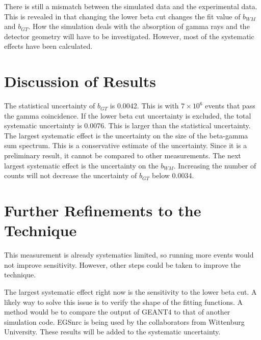 \documentclass[../MaxHughesThesis.tex]{subfiles}
\begin{document}
There is still a mismatch between the simulated data and the experimental data.
This is revealed in that changing the lower beta cut changes the fit value of $b_{WM}$ and $b_{GT}$.
How the simulation deals with the absorption of gamma rays and the detector geometry will have to be investigated.
However, most of the systematic effects have been calculated.

\section{Discussion of Results}

The statistical uncertainty of $b_{GT}$ is 0.0042.
This is with $7 \times 10^{6}$ events that pass the gamma coincidence.
If the lower beta cut uncertainty is excluded, the total systematic uncertainty is 0.0076.
This is larger than the statistical uncertainty.
The largest systematic effect is the uncertainty on the size of the beta-gamma sum spectrum.
This is a conservative estimate of the uncertainty.
Since it is a preliminary result, it cannot be compared to other measurements.
The next largest systematic effect is the uncertainty on the $b_{WM}$.
Increasing the number of counts will not decrease the uncertainty of $b_{GT}$ below 0.0034.


\section{Further Refinements to the Technique}
This measurement is already systematics limited, so running more events would not improve sensitivity.
However, other steps could be taken to improve the technique.

The largest systematic effect right now is the sensitivity to the lower beta cut. 
A likely way to solve this issue is to verify the shape of the fitting functions. 
A method would be to compare the output of GEANT4 to that of another simulation code.
EGSnrc is being used by the collaborators from Wittenburg University. 
These results will be added to the systematic uncertainty.
\end{document}
